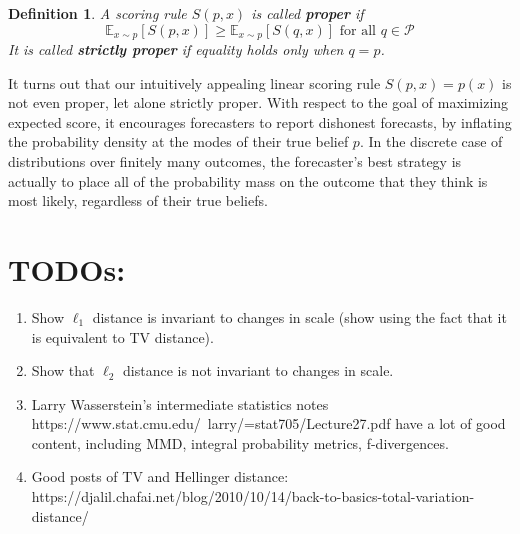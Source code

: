 \documentclass[12pt]{article}
\newcommand{\E}{\mathbb{E}}
\newtheorem{definition}{Definition}
\begin{document}
\begin{definition}
A scoring rule $S(p, x)$ is called \textbf{proper} if 
\[\E_{x \sim p}\left[S(p, x) \right] \geq \E_{x \sim p}\left[S(q, x) \right] \text{ for all } q  \in \mathcal{P}\]
It is called \textbf{strictly proper} if equality holds only when $q = p$. 
\end{definition}

It turns out that our intuitively appealing linear scoring rule $S(p, x) = p(x)$ is not even proper, let alone strictly proper. With respect to the goal of maximizing expected score, it encourages forecasters to report dishonest forecasts, 
by inflating the probability density at the modes of their true belief $p$. In the discrete case of distributions over finitely many outcomes, the forecaster's best strategy is actually to place all of the probability mass on the outcome that 
they think is most likely, regardless of their true beliefs. 



\section{TODOs:}
\begin{enumerate}
\item Show $\ell_1$ distance is invariant to changes in scale (show using the fact that it is equivalent to TV distance). 
\item Show that $\ell_2$ distance is not invariant to changes in scale. 
\item Larry Wasserstein's intermediate statistics notes https://www.stat.cmu.edu/~larry/=stat705/Lecture27.pdf have a lot of good content, including MMD, integral probability metrics, f-divergences. 
\item Good posts of TV and Hellinger distance: https://djalil.chafai.net/blog/2010/10/14/back-to-basics-total-variation-distance/
\end{enumerate}
\end{document}
